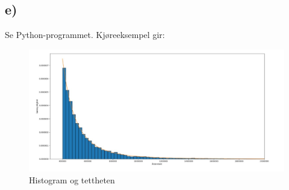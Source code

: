 \documentclass[a4paper, 12pt]{article}
\begin{document}
\subsection*{e)}
Se Python-programmet. Kjøreeksempel gir:
\begin{figure}[h]
    \centering
    \includegraphics[width=0.5\linewidth]{figur3.jpg}
    \caption{Histogram og tettheten}
    \label{fig:enter-label}
\end{figure}
\end{document}
